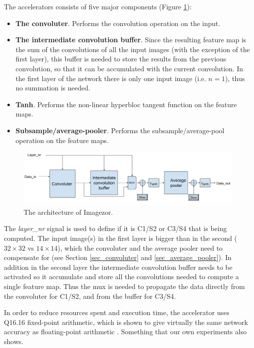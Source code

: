 The accelerators consists of five major components (Figure \ref{fig_imagezor_architecture}):

\begin{itemize}
	\item \textbf{The convoluter}. Performs the convolution operation on the input.
	\item \textbf{The intermediate convolution buffer}. Since the resulting feature map is the sum of the convolutions of all the input images (with the exception of the first layer), this buffer is needed to store the results from the previous convolution, so that it can be accumulated with the current convolution. In the first layer of the network there is only one input image (i.e. $ n = 1 $), thus no summation is needed.
	\item \textbf{Tanh}. Performs the non-linear hyperbloc tangent function  on the feature maps.
	\item \textbf{Subsample/average-pooler}. Performs the subsample/average-pool operation on the feature maps. 
\end{itemize}

\begin{figure}[h!]
	\centering
    	\includegraphics[width=1.0\textwidth]{Figures/Method/conv_layer_arch}
  	\caption{The architecture of Imagezor.}
  	\label{fig_imagezor_architecture}
\end{figure}

The \textit{layer\_nr} signal is used to define if it is C1/S2 or C3/S4 that is being computed. The input image(s) in the first layer is bigger than in the second ($ 32 \times 32 $ vs $ 14 \times 14 $), which the convoluter and the average pooler need to compensate for (see Section \ref{sec_convoluter} and \ref{sec_average_pooler}). In addition in the second layer the intermediate convolution buffer needs to be activated so it accumulate and store all the convolutions needed to compute a single feature map. Thus the mux is needed to propagate the data directly from the convoluter for C1/S2, and from the buffer for C3/S4. 


In order to reduce resources spent and execution time, the accelerator uses Q16.16 fixed-point arithmetic, which is shown to give virtually the same network accuracy as floating-point arithmetic\cite{Napocensis2009} \cite{Holt1993} \cite{Chen2014}. Something that our own experiments also shows.  

